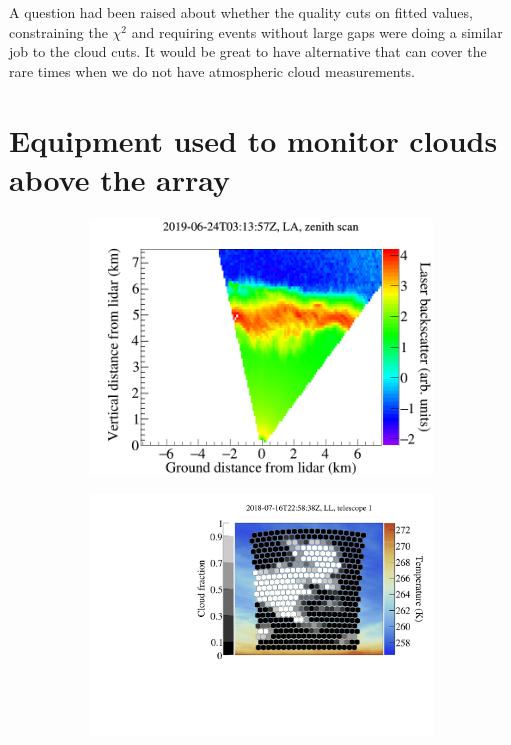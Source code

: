 A question had been raised about whether the quality cuts on fitted values, constraining the  $\chi^2$ and requiring events without large gaps were doing a similar job to the cloud cuts. It would be great to have alternative that can cover the rare times when we do not have atmospheric cloud measurements.

\section{Equipment used to monitor clouds above the array} \label{sec:MonitoringEquipment}



\begin{figure}[!t]
\begin{subfigure}[b]{0.3\textwidth}
\includegraphics[width=\textwidth]{chapters/graphs/CloudFlags/lidar_scan.png}
\caption{} \label{subfig:liadr_scan}
\end{subfigure}
\begin{subfigure}[b]{0.3\textwidth}
\includegraphics[width=\textwidth]{chapters/graphs/CloudFlags/ir_cloudfraction_pixels.pdf}

\end{subfigure}
\end{figure}
